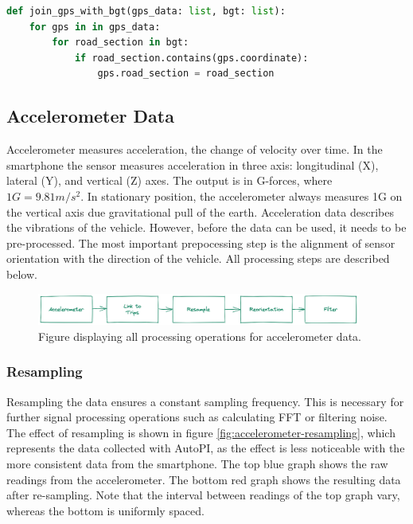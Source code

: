 \begin{lstlisting}[language=Python, caption={Psuedo implementation of joining GPS data with road sections.}, label={list:join-bgt}]
def join_gps_with_bgt(gps_data: list, bgt: list):
    for gps in in gps_data:
        for road_section in bgt:
            if road_section.contains(gps.coordinate):
                gps.road_section = road_section
\end{lstlisting}


\subsection{Accelerometer Data}
Accelerometer measures acceleration, the change of velocity over time. In the smartphone the sensor measures acceleration in three axis: longitudinal (X), lateral (Y), and vertical (Z) axes. The output is in G-forces, where $1 G = 9.81m/s^2$. In stationary position, the accelerometer always measures 1G on the vertical axis due gravitational pull of the earth. Acceleration data describes the vibrations of the vehicle. However, before the data can be used, it needs to be pre-processed. The most important prepocessing step is the alignment of sensor orientation with the direction of the vehicle. All processing steps are described below.

\begin{figure}[H]
\begin{center}
\includegraphics[width=0.95\textwidth,keepaspectratio]{images/4_data/processing-overview-accelerometer.png}
\end{center}
\captionsetup{width=.90\textwidth}
\caption{Figure displaying all processing operations for accelerometer data.}
\label{fig:processing-overview}
\end{figure}


\subsubsection{Resampling}
Resampling the data ensures a constant sampling frequency. This is necessary for further signal processing operations such as calculating FFT or filtering noise. The effect of resampling is shown in figure \ref{fig:accelerometer-resampling}, which represents the data collected with AutoPI, as the effect is less noticeable with the more consistent data from the smartphone. The top blue graph shows the raw readings from the accelerometer. The bottom red graph shows the resulting data after re-sampling. Note that the interval between readings of the top graph vary, whereas the bottom is uniformly spaced.

